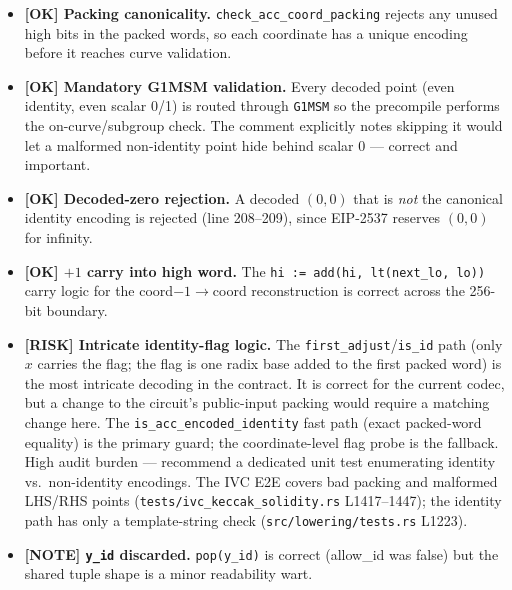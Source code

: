 \begin{itemize}
  \item \textcolor{tracegreen}{\textbf{[OK] Packing canonicality.}}
        \texttt{check\_\allowbreak{}acc\_\allowbreak{}coord\_\allowbreak{}packing} rejects any unused high bits
        in the packed words, so each coordinate has a unique encoding
        before it reaches curve validation.
  \item \textcolor{tracegreen}{\textbf{[OK] Mandatory G1MSM validation.}}
        Every decoded point (even identity, even scalar 0/1) is routed
        through \texttt{G1MSM} so the precompile performs the
        on-curve/subgroup check. The comment explicitly notes skipping
        it would let a malformed non-identity point hide behind scalar 0
        --- correct and important.
  \item \textcolor{tracegreen}{\textbf{[OK] Decoded-zero rejection.}} A
        decoded $(0,0)$ that is \emph{not} the canonical identity
        encoding is rejected (line 208--209), since EIP-2537 reserves
        $(0,0)$ for infinity.
  \item \textcolor{tracegreen}{\textbf{[OK] $+1$ carry into high word.}}
        The \texttt{hi := add(hi, lt(next\_\allowbreak{}lo, lo))} carry logic for the
        coord$-1\to$coord reconstruction is correct across the 256-bit
        boundary.
  \item \textcolor{rustorange}{\textbf{[RISK] Intricate identity-flag
        logic.}} The \texttt{first\_adjust}/\texttt{is\_id} path (only
        $x$ carries the flag; the flag is one radix base added to the
        first packed word) is the most intricate decoding in the
        contract. It is correct for the current codec, but a change to
        the circuit's public-input packing would require a matching
        change here. The \texttt{is\_\allowbreak{}acc\_\allowbreak{}encoded\_\allowbreak{}identity} fast path
        (exact packed-word equality) is the primary guard; the
        coordinate-level flag probe is the fallback. High audit burden
        --- recommend a dedicated unit test enumerating identity vs.\
        non-identity encodings.  The IVC E2E covers
        bad packing and malformed LHS/RHS points
        (\texttt{tests/\allowbreak{}ivc\_\allowbreak{}keccak\_\allowbreak{}solidity.rs} L1417--1447); the
        identity path has only a template-string check
        (\texttt{src/\allowbreak{}lowering/\allowbreak{}tests.rs} L1223).
  \item \textcolor{mathpurple}{\textbf{[NOTE] \texttt{y\_id} discarded.}}
        \texttt{pop(y\_id)} is correct (allow\_id was false) but the
        shared tuple shape is a minor readability wart.
\end{itemize}

